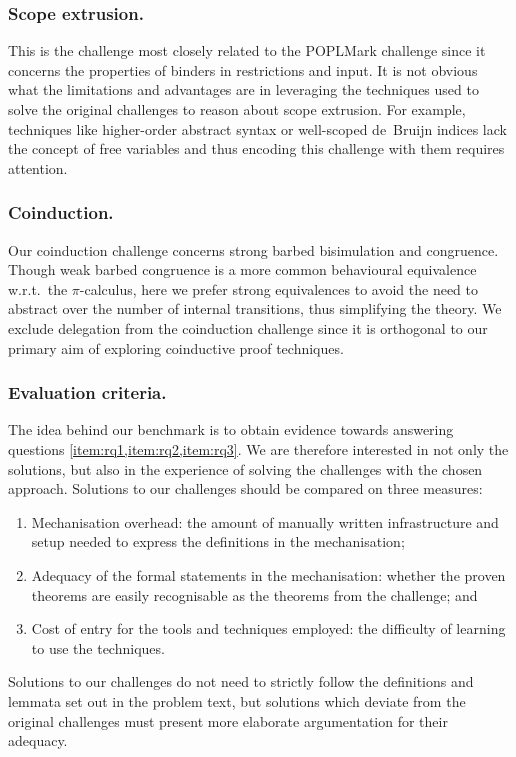 \documentclass[runningheads]{llncs}
\begin{document}
\subsubsection{Scope extrusion.}
This is the challenge most closely related to the POPLMark challenge
since it concerns the properties of binders in restrictions and input.
It is not obvious what the limitations and advantages are in
leveraging the techniques used to solve the original challenges to
reason about scope extrusion.  For example, techniques like
higher-order abstract syntax or well-scoped de\ Bruijn indices lack
the concept of free variables and thus encoding this challenge with
them requires attention.

\subsubsection{Coinduction.}
Our coinduction challenge concerns strong barbed bisimulation and
congruence.
Though weak barbed congruence is a more common behavioural equivalence
w.r.t.\ the \(\pi\)-calculus, here we prefer strong equivalences to avoid the
need to abstract over the number of internal transitions, thus
simplifying the theory.  We exclude delegation from the coinduction
challenge since it is orthogonal to our primary aim of exploring
coinductive proof techniques.

\subsubsection{Evaluation criteria.}
The idea behind our benchmark is to obtain evidence towards answering questions \cref{item:rq1,item:rq2,item:rq3}. We are therefore interested in not only the solutions, but also in the experience of solving the challenges with the chosen approach.
Solutions to our challenges should be compared on three measures:
\begin{enumerate}
\item Mechanisation overhead: the amount of manually written infrastructure and setup needed to express the definitions in the mechanisation;
\item Adequacy of the formal statements in the mechanisation: whether the proven theorems are easily recognisable as the theorems from the challenge; and
\item Cost of entry for the tools and techniques employed: the difficulty of learning to use the techniques.
\end{enumerate}
Solutions to our challenges do not need to strictly follow the definitions and lemmata set out in the problem text, but solutions which deviate from the original challenges must present more elaborate argumentation for their adequacy.
\end{document}
